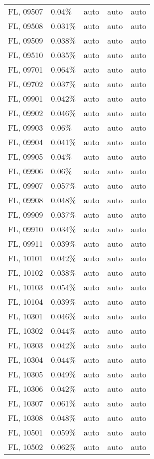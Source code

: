 \begin{longtable}[]{@{}lllll@{}}
FL, 09507 & 0.04\% & auto & auto & auto \\
FL, 09508 & 0.031\% & auto & auto & auto \\
FL, 09509 & 0.038\% & auto & auto & auto \\
FL, 09510 & 0.035\% & auto & auto & auto \\
FL, 09701 & 0.064\% & auto & auto & auto \\
FL, 09702 & 0.037\% & auto & auto & auto \\
FL, 09901 & 0.042\% & auto & auto & auto \\
FL, 09902 & 0.046\% & auto & auto & auto \\
FL, 09903 & 0.06\% & auto & auto & auto \\
FL, 09904 & 0.041\% & auto & auto & auto \\
FL, 09905 & 0.04\% & auto & auto & auto \\
FL, 09906 & 0.06\% & auto & auto & auto \\
FL, 09907 & 0.057\% & auto & auto & auto \\
FL, 09908 & 0.048\% & auto & auto & auto \\
FL, 09909 & 0.037\% & auto & auto & auto \\
FL, 09910 & 0.034\% & auto & auto & auto \\
FL, 09911 & 0.039\% & auto & auto & auto \\
FL, 10101 & 0.042\% & auto & auto & auto \\
FL, 10102 & 0.038\% & auto & auto & auto \\
FL, 10103 & 0.054\% & auto & auto & auto \\
FL, 10104 & 0.039\% & auto & auto & auto \\
FL, 10301 & 0.046\% & auto & auto & auto \\
FL, 10302 & 0.044\% & auto & auto & auto \\
FL, 10303 & 0.042\% & auto & auto & auto \\
FL, 10304 & 0.044\% & auto & auto & auto \\
FL, 10305 & 0.049\% & auto & auto & auto \\
FL, 10306 & 0.042\% & auto & auto & auto \\
FL, 10307 & 0.061\% & auto & auto & auto \\
FL, 10308 & 0.048\% & auto & auto & auto \\
FL, 10501 & 0.059\% & auto & auto & auto \\
FL, 10502 & 0.062\% & auto & auto & auto \\

\end{longtable}
